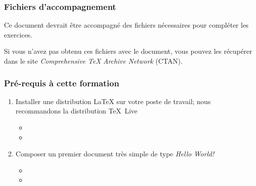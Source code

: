 \begin{frame}
  \frametitle{Fichiers d'accompagnement}

  Ce document devrait être accompagné des fichiers nécessaires pour
  compléter les exercices.
  \bigskip

  Si vous n'avez pas obtenu ces fichiers avec le document, vous pouvez
  les récupérer dans le site \emph{Comprehensive TeX Archive Network}
  (CTAN).
  \medskip
  \begin{center}
    \href{\ctanurl}{\ctanbutton}
  \end{center}
\end{frame}

\begin{frame}
  \frametitle{Pré-requis à cette formation}
  \begin{enumerate}
  \item Installer une distribution {\LaTeX} sur votre poste de
    travail; nous recommandons la distribution {\TeX}~Live
    \begin{itemize}
      \normalsize
    \item[] 
    \item[] 
    \end{itemize}
    \bigskip
  \item Composer un premier document très simple de type \emph{Hello World!}
    \begin{itemize}
      \normalsize
    \item[] 
    \item[] 
    \end{itemize}
  \end{enumerate}
\end{frame}

